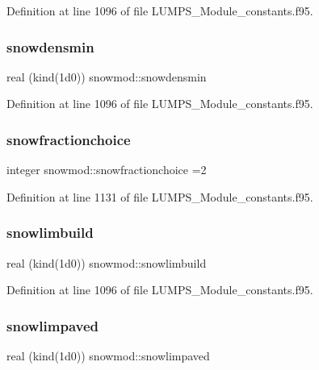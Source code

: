 Definition at line 1096 of file L\+U\+M\+P\+S\+\_\+\+Module\+\_\+constants.\+f95.

\mbox{\label{namespacesnowmod_a4b6de2a8e2186c8f314bbbfe6e78d345}} 
\subsubsection{\texorpdfstring{snowdensmin}{snowdensmin}}
{\footnotesize\ttfamily real (kind(1d0)) snowmod\+::snowdensmin}



Definition at line 1096 of file L\+U\+M\+P\+S\+\_\+\+Module\+\_\+constants.\+f95.

\mbox{\label{namespacesnowmod_afb1d5c1c466c1cb87fcf8548322581a1}} 
\subsubsection{\texorpdfstring{snowfractionchoice}{snowfractionchoice}}
{\footnotesize\ttfamily integer snowmod\+::snowfractionchoice =2}



Definition at line 1131 of file L\+U\+M\+P\+S\+\_\+\+Module\+\_\+constants.\+f95.

\mbox{\label{namespacesnowmod_a0462c0f187d9c6a590598f728f776991}} 
\subsubsection{\texorpdfstring{snowlimbuild}{snowlimbuild}}
{\footnotesize\ttfamily real (kind(1d0)) snowmod\+::snowlimbuild}



Definition at line 1096 of file L\+U\+M\+P\+S\+\_\+\+Module\+\_\+constants.\+f95.

\mbox{\label{namespacesnowmod_a7e327a63642bd081c76b33340881ae7b}} 
\subsubsection{\texorpdfstring{snowlimpaved}{snowlimpaved}}
{\footnotesize\ttfamily real (kind(1d0)) snowmod\+::snowlimpaved}



